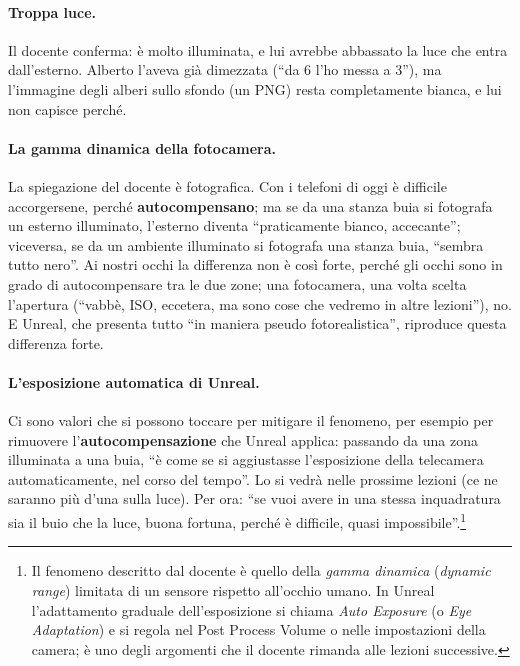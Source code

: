 \paragraph{Troppa luce.} Il docente conferma: è molto illuminata, e lui avrebbe
abbassato la luce che entra dall'esterno. Alberto l'aveva già dimezzata (``da 6 l'ho
messa a 3''), ma l'immagine degli alberi sullo sfondo (un PNG) resta completamente
bianca, e lui non capisce perché.

\paragraph{La gamma dinamica della fotocamera.} La spiegazione del docente è
fotografica. Con i telefoni di oggi è difficile accorgersene, perché
\textbf{autocompensano}; ma se da una stanza buia si fotografa un esterno illuminato,
l'esterno diventa ``praticamente bianco, accecante''; viceversa, se da un ambiente
illuminato si fotografa una stanza buia, ``sembra tutto nero''. Ai nostri occhi la
differenza non è così forte, perché gli occhi sono in grado di autocompensare tra le
due zone; una fotocamera, una volta scelta l'apertura (``vabbè, ISO, eccetera, ma sono
cose che vedremo in altre lezioni''), no. E Unreal, che presenta tutto ``in maniera
pseudo fotorealistica'', riproduce questa differenza forte.

\paragraph{L'esposizione automatica di Unreal.} Ci sono valori che si possono toccare
per mitigare il fenomeno, per esempio per rimuovere l'\textbf{autocompensazione} che
Unreal applica: passando da una zona illuminata a una buia, ``è come se si aggiustasse
l'esposizione della telecamera automaticamente, nel corso del tempo''. Lo si vedrà
nelle prossime lezioni (ce ne saranno più d'una sulla luce). Per ora: ``se vuoi avere in
una stessa inquadratura sia il buio che la luce, buona fortuna, perché è difficile,
quasi impossibile''.\footnote{Il fenomeno descritto dal docente è quello della
\emph{gamma dinamica} (\emph{dynamic range}) limitata di un sensore rispetto
all'occhio umano. In Unreal l'adattamento graduale dell'esposizione si chiama
\emph{Auto Exposure} (o \emph{Eye Adaptation}) e si regola nel Post Process Volume o
nelle impostazioni della camera; è uno degli argomenti che il docente rimanda alle
lezioni successive.}

